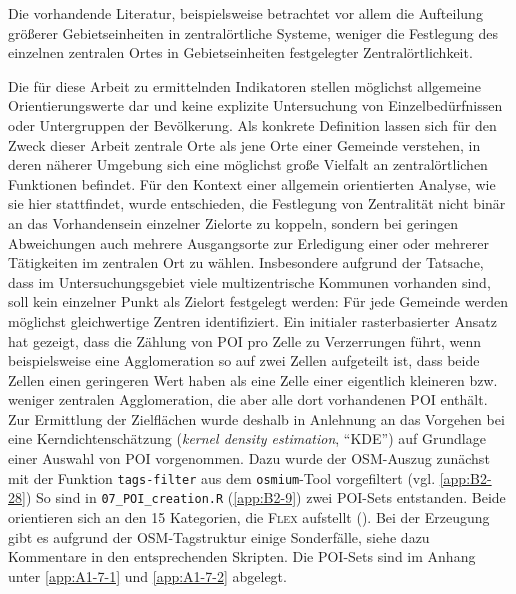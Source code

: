 \documentclass[11pt,pdftex,a4paper]{scrartcl}
\begin{document}
	Die vorhandende Literatur, beispielsweise \textcites{leeDelimitingBoundariesMarket2014}{vanmeeterenChristallerBigData2018}{zhongProfilingSpatialStructure2018} betrachtet vor allem die Aufteilung größerer Gebietseinheiten in zentralörtliche Systeme, weniger die Festlegung des einzelnen zentralen Ortes in Gebietseinheiten festgelegter Zentralörtlichkeit.
	
	Die für diese Arbeit zu ermittelnden Indikatoren stellen möglichst allgemeine Orientierungswerte dar und keine explizite Untersuchung von Einzelbedürfnissen oder Untergruppen der Bevölkerung. Als konkrete Definition lassen sich für den Zweck dieser Arbeit zentrale Orte als jene Orte einer Gemeinde verstehen, in deren näherer Umgebung sich eine möglichst große Vielfalt an zentralörtlichen Funktionen befindet. Für den Kontext einer allgemein orientierten Analyse, wie sie hier stattfindet, wurde entschieden, die Festlegung von Zentralität nicht binär an das Vorhandensein einzelner Zielorte zu koppeln, sondern bei geringen Abweichungen auch mehrere Ausgangsorte zur Erledigung einer oder mehrerer Tätigkeiten im zentralen Ort zu wählen. Insbesondere aufgrund der Tatsache, dass im Untersuchungsgebiet viele multizentrische Kommunen vorhanden sind, soll kein einzelner Punkt als Zielort festgelegt werden: Für jede Gemeinde werden möglichst gleichwertige Zentren identifiziert. Ein initialer rasterbasierter Ansatz hat gezeigt, dass die Zählung von POI pro Zelle zu Verzerrungen führt, wenn beispielsweise eine Agglomeration so auf zwei Zellen aufgeteilt ist, dass beide Zellen einen geringeren Wert haben als eine Zelle einer eigentlich kleineren bzw. weniger zentralen Agglomeration, die aber alle dort vorhandenen POI enthält. Zur Ermittlung der Zielflächen wurde deshalb in Anlehnung an das Vorgehen bei \textcite{Flex2016} eine Kerndichtenschätzung (\textit{kernel density estimation}, \enquote{KDE}) auf Grundlage einer Auswahl von POI vorgenommen. Dazu wurde der OSM-Auszug zunächst mit der Funktion \texttt{tags-filter} aus dem \texttt{osmium}-Tool \parencite{OsmcodeOsmiumtool2026} vorgefiltert (vgl. \ref{app:B2-28})
	 So sind in \texttt{07\_POI\_creation.R} (\ref{app:B2-9}) zwei POI-Sets entstanden. Beide orientieren sich an den \num{15} Kategorien, die \textsc{Flex} aufstellt (\citeyear[Tabelle 1 auf Seite 151]{Flex2016}). Bei der Erzeugung gibt es aufgrund der OSM-Tagstruktur einige Sonderfälle, siehe dazu Kommentare in den entsprechenden Skripten. Die POI-Sets sind im Anhang unter \ref{app:A1-7-1} und \ref{app:A1-7-2} abgelegt.
\end{document}
